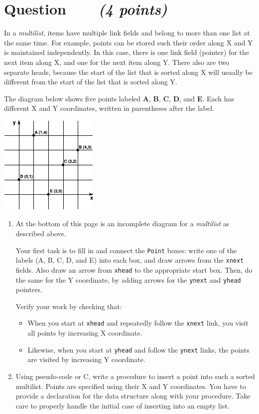 \documentclass[a4paper]{article}
\newcounter{question}
\newcommand{\question}[1]{\refstepcounter{question}\section*{Question~\thequestion~~~\small\emph{(#1)}}}
\renewcommand*\thequestion{\arabic{question}}
\begin{document}
\clearpage


\question{4 points}

In a \emph{multilist}, items have multiple link fields and belong to more than one list at the same time.
For example, points can be stored such their order along X and Y is maintained independently.
In this case, there is one link field (pointer) for the next item along X, and one for the next item along Y.
There also are two separate heads, because the start of the list that is sorted along X will usually be different from the start of the list that is sorted along Y.

The diagram below shows five points labeled \textbf{A}, \textbf{B}, \textbf{C}, \textbf{D}, and \textbf{E}.
Each has different X and Y coordinates, written in parentheses after the label.

\vfill

\noindent
\begin{center}
  \includegraphics[width=0.4\columnwidth]{q2a.pdf}
\end{center}

\vfill

\begin{enumerate}
\item
  At the bottom of this page is an incomplete diagram for a \emph{multilist} as described above.
  
  Your first task is to fill in and connect the \texttt{Point} boxes:
  write one of the labels (A, B, C, D, and E) into each box, and draw arrows from the \texttt{xnext} fields.
  Also draw an arrow from \texttt{xhead} to the appropriate start box.
  Then, do the same for the Y coordinate, by adding arrows for the \texttt{ynext} and \texttt{yhead} pointers.
  
  Verify your work by checking that:
  \begin{itemize}
  \item
    When you start at \texttt{xhead} and repeatedly follow the \texttt{xnext} link, you visit all points by increasing X coordinate.
  \item
    Likewise, when you start at \texttt{yhead} and follow the \texttt{ynext} links, the points are visited by increasing Y coordinate.
  \end{itemize}
  
\item
  Using pseudo-code or C, write a procedure to insert a point into such a sorted multilist.
  Points are specified using their X and Y coordinates.
  You have to provide a declaration for the data structure along with your procedure.
  Take care to properly handle the initial case of inserting into an empty list.
\end{enumerate}
\end{document}
